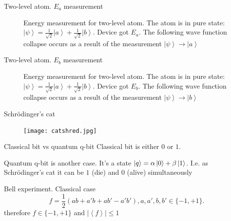 \documentclass[10pt,pdf,hyperref={unicode}]{beamer}
\begin{document}
\begin{frame}{Two-level atom. $E_a$ measurement}
\begin{figure}
\centering



\caption{Energy measurement for two-level atom. The atom is in pure
  state: $\left|\psi\right> = 
  \frac{1}{\sqrt{2}}\left|a\right> + \frac{1}{\sqrt{2}}\left|b\right>$.
  Device got $E_a$. The following wave function collapse occurs as a
  result of the measurement $\left|\psi\right> \to \left|a\right>$
}
\label{fig:add:mesure_ex_a}
\end{figure}
\end{frame}

\begin{frame}{Two-level atom. $E_b$ measurement}
\begin{figure}
\centering



\caption{Energy measurement for two-level atom. The atom is in pure
  state: $\left|\psi\right> = 
\frac{1}{\sqrt{2}}\left|a\right> + \frac{1}{\sqrt{2}}\left|b\right>$.
Device got $E_b$. The following wave function collapse occurs as a
  result of the measurement $\left|\psi\right> \to \left|b\right>$
}
\label{fig:add:mesure_ex_b}
\end{figure}
\end{frame}

\begin{frame}{Schrödinger's cat}
 \begin{figure} 
   \texttt{[image: catshred.jpg]}
  \end{figure}
\end{frame}

\begin{frame}{Classical bit vs quantum q-bit}
  Classical bit is either $0$ or $1$.

  Quantum q-bit is another case. It's a state
  $\ket{q} = \alpha \ket{0} + \beta \ket{1}$. I.e. as Schrödinger's
  cat it can be $1$ (die) and $0$ (alive) simultaneously
\end{frame}


\begin{frame}{Bell experiment. Classical case}
\[
f = \frac{1}{2}\left(
a b + a' b + a b' - a' b'
\right), a,a',b,b' \in \{-1, +1\}.
\]
therefore
\(
f \in \{-1, +1\}
\)
and
\(
\left|\left<f\right>\right| \le 1
\)
\end{frame}
\end{document}
